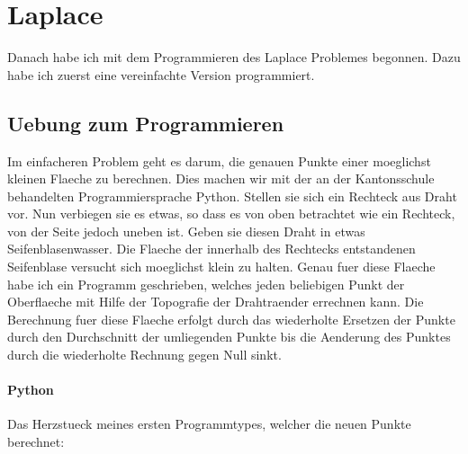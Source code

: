 \documentclass[pdftex,12pt,a4paper]{article}
\begin{document}
\newpage

\section {Laplace}

Danach habe ich mit dem Programmieren des Laplace Problemes begonnen.
Dazu habe ich zuerst eine vereinfachte Version programmiert.

\subsection {Uebung zum Programmieren}

Im einfacheren Problem geht es darum, die genauen Punkte einer moeglichst kleinen Flaeche zu berechnen.
Dies machen wir mit der an der Kantonsschule behandelten Programmiersprache Python.
Stellen sie sich ein Rechteck aus Draht vor.
Nun verbiegen sie es etwas, so dass es von oben betrachtet wie ein Rechteck,
von der Seite jedoch uneben ist.
Geben sie diesen Draht in etwas Seifenblasenwasser. 
Die Flaeche der innerhalb des Rechtecks entstandenen Seifenblase versucht sich moeglichst klein zu halten. 
Genau fuer diese Flaeche habe ich ein Programm geschrieben, welches jeden beliebigen Punkt der Oberflaeche mit Hilfe der Topografie der Drahtraender errechnen kann.
Die Berechnung fuer diese Flaeche erfolgt durch das wiederholte Ersetzen der Punkte durch den Durchschnitt der umliegenden Punkte bis die Aenderung des Punktes durch die wiederholte Rechnung gegen Null sinkt.

\newpage
\paragraph {Python}

Das Herzstueck meines ersten Programmtypes, welcher die neuen Punkte berechnet:
\end{document}
